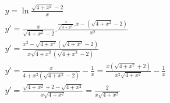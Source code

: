 \begin{ex}
\begin{align}
&y=\ln{\frac{\sqrt{4+x^2}-2}{x}}\nonumber\\
&y'=\frac{x}{\sqrt{4+x^2}-2}.\frac{\frac{x}{\sqrt{4+x^2}}.x-(\sqrt{4+x^2}-2)}{x^2}\nonumber\\
&y'=\frac{x^2-\sqrt{4+x^2}(\sqrt{4+x^2}-2)}{x\sqrt{4+x^2}(\sqrt{4+x^2}-2)}\nonumber\\
&y'=\frac{x}{4+x^2(\sqrt{4+x^2}-2)}-\frac{1}{x}=\frac{x(\sqrt{4+x^2}+2)}{x^2\sqrt{4+x^2}}-\frac{1}{x}\nonumber\\
&y'=\frac{\sqrt{4+x^2}+2-\sqrt{4+x^2}}{x\sqrt{4+x^2}}=\frac{2}{x\sqrt{4+x^2}}\nonumber
\end{align}
\end{ex}